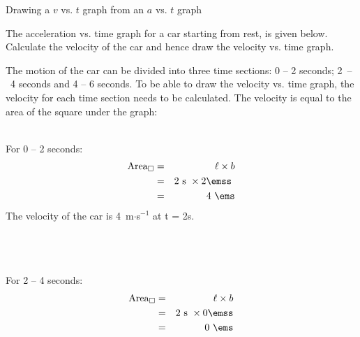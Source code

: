 \begin{wex}{Drawing a $v$ vs. $t$ graph from an $a$ vs. $t$ graph}
{The acceleration vs. time graph for a car starting from rest, is given below. Calculate the velocity of the car and hence draw the velocity vs. time graph.
\begin{center}
\end{center}}
{
The motion of the car can be divided into three time sections: 0 -- 2 seconds; 2~--~4 seconds and 4 -- 6 seconds. To be able to draw the velocity vs. time graph, the velocity for each time section needs to be calculated. The velocity is equal to the area of the square under the graph:\\
\\
\begin{minipage}{0.3\textwidth}
For 0 -- 2 seconds:
\begin{eqnarray*}
\text{Area}_{\square} &=& \ell \times b\\
&=& 2\text{~s}\ \times 2\emss\ \\
&=&4\ \ems\\
\end{eqnarray*}
The velocity of the car is 4~m$\cdot$s$^{-1}$ at t = 2s.\\
\\
\\
\\
\end{minipage}
\begin{minipage}{0.03\textwidth}
\begin{center}
\end{center}
\end{minipage}
\begin{minipage}{0.3\textwidth}
For 2 -- 4 seconds:
\begin{eqnarray*}
\text{Area}_{\square} &=& \ell \times b\\
&=& 2\text{~s}\ \times 0\emss\\
&=&0\ \ems\\

\end{eqnarray*}
\end{minipage}}
\end{wex}
